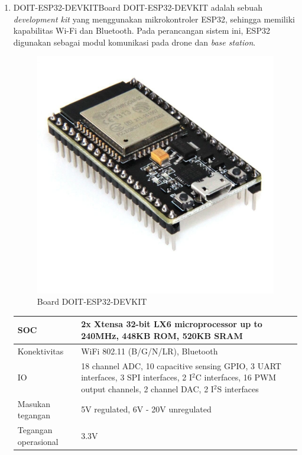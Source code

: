 \begin{enumerate}
	\item DOIT-ESP32-DEVKIT\newline Board DOIT-ESP32-DEVKIT adalah sebuah \textit{development kit} yang menggunakan mikrokontroler ESP32, sehingga memiliki kapabilitas Wi-Fi dan Bluetooth. Pada perancangan sistem ini, ESP32 digunakan sebagai modul komunikasi pada drone dan \textit{base station}.
	\begin{figure}[H]
		\centering
		\includegraphics[scale=0.2]{./assets/ESP32}
		\caption{Board DOIT-ESP32-DEVKIT}
	\end{figure}
	\begin{longtable}{|p{2cm}|p{8cm}|}
		\hline
		SOC&2x Xtensa 32-bit LX6 microprocessor up to 240MHz, 448KB ROM, 520KB SRAM\\
		\hline
		Konektivitas&WiFi 802.11 (B/G/N/LR), Bluetooth\\
		\hline
		IO&18 channel ADC, 10 capacitive sensing GPIO, 3 UART interfaces, 3 SPI interfaces, 2 I$^2$C interfaces, 16 PWM output channels, 2 channel DAC, 2 I$^2$S interfaces\\
		\hline
		Masukan tegangan&5V regulated, 6V - 20V unregulated\\
		\hline
		Tegangan operasional&3.3V\\

\end{longtable}
\end{enumerate}
